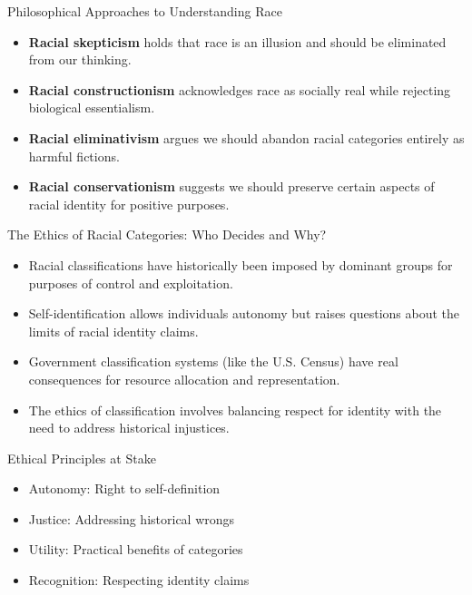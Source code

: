 \documentclass{beamer}
\begin{document}
	\begin{frame}{Philosophical Approaches to Understanding Race}
		\begin{itemize}
			\item \textbf{Racial skepticism} holds that race is an illusion and should be eliminated from our thinking.
			\item \textbf{Racial constructionism} acknowledges race as socially real while rejecting biological essentialism.
			\item \textbf{Racial eliminativism} argues we should abandon racial categories entirely as harmful fictions.
			\item \textbf{Racial conservationism} suggests we should preserve certain aspects of racial identity for positive purposes.
		\end{itemize}
		
		\begin{center}
		\end{center}
	\end{frame}
	
	\begin{frame}{The Ethics of Racial Categories: Who Decides and Why?}
		\begin{itemize}
			\item Racial classifications have historically been imposed by dominant groups for purposes of control and exploitation.
			\item Self-identification allows individuals autonomy but raises questions about the limits of racial identity claims.
			\item Government classification systems (like the U.S. Census) have real consequences for resource allocation and representation.
			\item The ethics of classification involves balancing respect for identity with the need to address historical injustices.
		\end{itemize}
		
		\begin{block}{Ethical Principles at Stake}
			\begin{itemize}
				\item Autonomy: Right to self-definition
				\item Justice: Addressing historical wrongs
				\item Utility: Practical benefits of categories
				\item Recognition: Respecting identity claims
			\end{itemize}
		\end{block}
	\end{frame}
	
\end{document}

